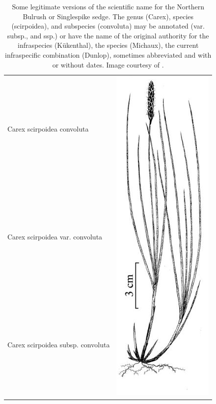 \documentclass{bmcart}
\begin{document}
\begin{table}[!htb]
  \begin{center}

  \caption{Some legitimate versions of the scientific name for the Northern
    Bulrush or Singlespike sedge.  The genus (Carex), species (scirpoidea),
    and subspecies (convoluta) may be annotated (var. subsp., and ssp.) or
    have the name of the original authority for the infraspecies (Kükenthal),
    the species (Michaux), the current infraspecific combination (Dunlop),
    sometimes abbreviated and with or without dates. Image courtesy of
  \cite{FNA2002}.}\label{table:carex}

    \begin{tabular}{| l | c |}
    \hline
    Carex scirpoidea convoluta &
    \multirow{24}{*}{\includegraphics[scale=0.3]{images/carex.png}} \\
    Carex scirpoidea var. convoluta & \\
    Carex scirpoidea subsp. convoluta & \\

\end{tabular}
\end{center}
\end{table}
\end{document}
